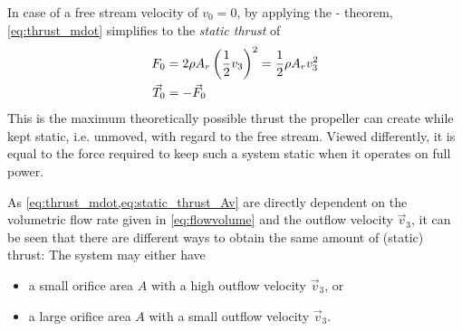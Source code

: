 
In case of a free stream velocity of $v_0 = 0$, by applying the - theorem, \cref{eq:thrust_mdot} simplifies to the \textit{static thrust} of
%
\begin{align}
F_{0} &= 2 \rho A_r \left(\frac{1}{2}v_3\right)^2
       = \frac{1}{2} \rho A_r v_3^2 \label{eq:static_thrust_Av} \\
\vec{T}_{0} &= -\vec{F}_{0}
\end{align}
%
This is the maximum theoretically possible thrust the propeller can create while kept static, i.e. unmoved, with regard to the free stream. 
Viewed differently, it is equal to the force required to keep such a system static when it operates on full power.


As \cref{eq:thrust_mdot,eq:static_thrust_Av} are directly dependent on the volumetric flow rate given in \cref{eq:flowvolume} and the outflow velocity $\vec{v}_3$, 
it can be seen that there are different ways to obtain the same amount of (static) thrust: The system may either have

\begin{itemize}
	\item a small orifice area $A$ with a high outflow velocity $\vec{v}_{3}$, or
	\item a large orifice area $A$ with a small outflow velocity $\vec{v}_{3}$.
\end{itemize}

